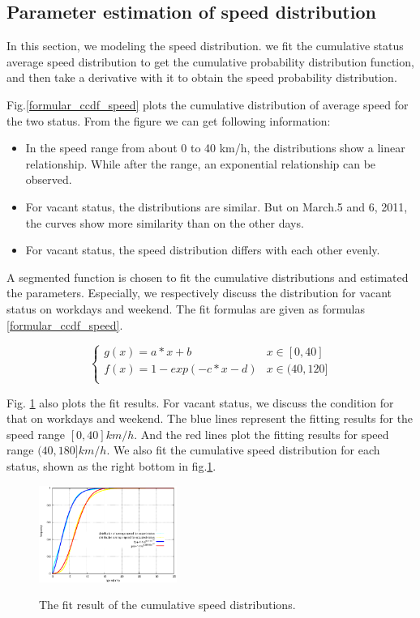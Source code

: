 \subsection{Parameter estimation of speed distribution}
\label{section_speed_modeling}
In this section, we modeling the speed distribution. we fit the cumulative status average speed distribution to get the cumulative probability distribution function, and then take a derivative with it to obtain the speed probability distribution.

Fig.\ref{formular_ccdf_speed} plots the cumulative distribution of average speed for the two status. From the figure we can get following information:
\begin{itemize}
  \item In the speed range from about 0 to 40 km/h, the distributions show a linear relationship. While after the range, an exponential relationship can be observed.
  \item For vacant status, the distributions are similar. But on March.5 and 6, 2011, the curves show more similarity than on the other days.
  \item For vacant status, the speed distribution differs with each other evenly.
\end{itemize}

 A segmented function is chosen to fit the cumulative distributions and estimated the parameters. Especially, we respectively discuss the distribution for vacant status on workdays and weekend.
The fit formulas are given as formulas \ref{formular_ccdf_speed}.

\begin{equation}\label{formular_ccdf_speed}
\left\{
\begin{array}{ll}
 g(x)=a*x+b & x \in [0,40]\\
 f(x)=1-exp(-c*x-d)& x\in(40,120]\\
\end{array}
\right.
\end{equation}


Fig. \ref{figure_fit_ccdf_speed} also plots the fit results. For vacant status, we discuss the condition for that on workdays and weekend. The blue lines represent the fitting results for the speed range $[0,40] km/h$. And the red lines plot the fitting results for speed range $(40,180] km/h$.
We also fit the cumulative speed distribution for each status, shown as the right bottom in fig.\ref{figure_fit_ccdf_speed}.

\begin{figure}[htbp]
\centering
\includegraphics[width=0.4\textwidth]{figures_201103/fit/speedfit.eps}\\
\centering
\caption{The fit result of the cumulative speed distributions.}\label{figure_fit_ccdf_speed}
\end{figure}

